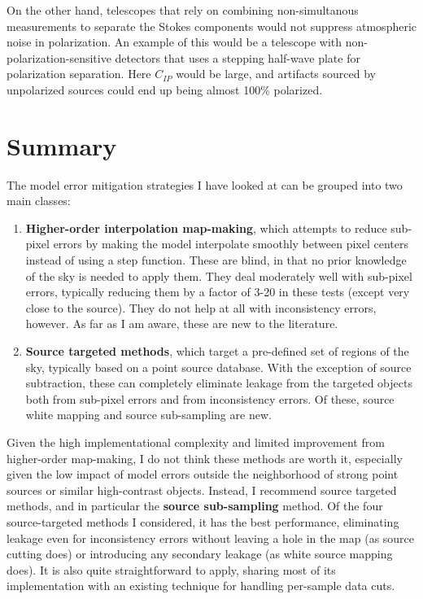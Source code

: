 \documentclass{article}
\newcommand{\dfn}[1]{\textbf{#1}}
\begin{document}
On the other hand, telescopes that rely on combining non-simultanous measurements
to separate the Stokes components would not suppress atmospheric noise in polarization.
An example of this would be a telescope with non-polarization-sensitive detectors that
uses a stepping half-wave plate for polarization separation. Here $C_{IP}$ would be
large, and artifacts sourced by unpolarized sources could end up being almost 100\%
polarized.

\section{Summary}
The model error mitigation strategies I have looked at can be grouped into two main classes:
\begin{enumerate}
	\item \dfn{Higher-order interpolation map-making}, which attempts to reduce sub-pixel errors by
		making the model interpolate smoothly between pixel centers instead of using a step function.
		These are blind, in that no prior knowledge of the sky is needed to apply them. They deal
		moderately well with sub-pixel errors, typically reducing them by a factor of 3-20
		in these tests
		(except very close to the source). They do not help at all with inconsistency errors, however.
		As far as I am aware, these are new to the literature.
	\item \dfn{Source targeted methods}, which target a pre-defined set of regions of the sky, typically
		based on a point source database. With the exception of source subtraction, these can completely
		eliminate leakage from the targeted objects both from sub-pixel errors and from inconsistency
		errors. Of these, source white mapping and source sub-sampling are new.
\end{enumerate}
Given the high implementational complexity and limited improvement from higher-order map-making,
I do not think these methods are worth it, especially given the low impact of model errors outside
the neighborhood of strong point sources or similar high-contrast objects. Instead, I recommend
source targeted methods, and in particular the \dfn{source sub-sampling} method. Of the four source-targeted
methods I considered, it has the best performance, eliminating leakage even for inconsistency errors
without leaving a hole in the map (as source cutting does) or introducing any secondary leakage
(as white source mapping does). It is also quite straightforward to apply, sharing most of its
implementation with an existing technique for handling per-sample data cuts.
\end{document}
